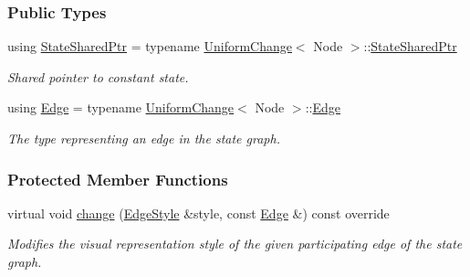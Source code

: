 \subsubsection*{Public Types}
\begin{DoxyCompactItemize}
\item 
using \hyperlink{structSolvedGoal_abcb9cbd538270a8f85b556059f6d7b62}{State\+Shared\+Ptr} = typename \hyperlink{structUniformChange}{Uniform\+Change}$<$ Node $>$\+::\hyperlink{structEventBase_a2c0edb5cda08ce1965f3440a97b3fc87}{State\+Shared\+Ptr}\hypertarget{structSolvedGoal_abcb9cbd538270a8f85b556059f6d7b62}{}\label{structSolvedGoal_abcb9cbd538270a8f85b556059f6d7b62}

\begin{DoxyCompactList}\small\item\em Shared pointer to constant state. \end{DoxyCompactList}\item 
using \hyperlink{structSolvedGoal_a24fbc32b3600956b02d03183b15df5dc}{Edge} = typename \hyperlink{structUniformChange}{Uniform\+Change}$<$ Node $>$\+::\hyperlink{structUniformChange_a34b7655a38ac1deb98a5978cb1ad5cf6}{Edge}\hypertarget{structSolvedGoal_a24fbc32b3600956b02d03183b15df5dc}{}\label{structSolvedGoal_a24fbc32b3600956b02d03183b15df5dc}

\begin{DoxyCompactList}\small\item\em The type representing an edge in the state graph. \end{DoxyCompactList}\end{DoxyCompactItemize}
\subsubsection*{Protected Member Functions}
\begin{DoxyCompactItemize}
\item 
virtual void \hyperlink{structSolvedGoal_ac6ae80b95582586b6fe46dfe2ddad96b}{change} (\hyperlink{structEdgeStyle}{Edge\+Style} \&style, const \hyperlink{structUniformChange_a34b7655a38ac1deb98a5978cb1ad5cf6}{Edge} \&) const override\hypertarget{structSolvedGoal_ac6ae80b95582586b6fe46dfe2ddad96b}{}\label{structSolvedGoal_ac6ae80b95582586b6fe46dfe2ddad96b}

\begin{DoxyCompactList}\small\item\em Modifies the visual representation style of the given participating edge of the state graph. \end{DoxyCompactList}\end{DoxyCompactItemize}
